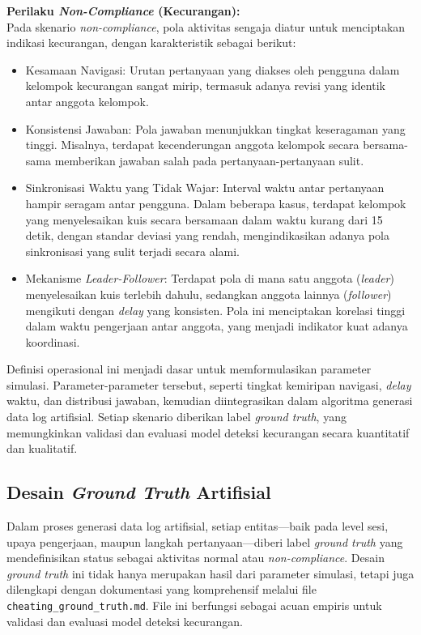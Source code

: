\textbf{Perilaku \textit{Non-Compliance} (Kecurangan):} \\
Pada skenario \textit{non-compliance}, pola aktivitas sengaja diatur untuk menciptakan indikasi kecurangan, dengan karakteristik sebagai berikut:
\begin{itemize}
    \item Kesamaan Navigasi: Urutan pertanyaan yang diakses oleh pengguna dalam kelompok kecurangan sangat mirip, termasuk adanya revisi yang identik antar anggota kelompok.
    \item Konsistensi Jawaban: Pola jawaban menunjukkan tingkat keseragaman yang tinggi. Misalnya, terdapat kecenderungan anggota kelompok secara bersama-sama memberikan jawaban salah pada pertanyaan-pertanyaan sulit.
    \item Sinkronisasi Waktu yang Tidak Wajar: Interval waktu antar pertanyaan hampir seragam antar pengguna. Dalam beberapa kasus, terdapat kelompok yang menyelesaikan kuis secara bersamaan dalam waktu kurang dari 15 detik, dengan standar deviasi yang rendah, mengindikasikan adanya pola sinkronisasi yang sulit terjadi secara alami.
    \item Mekanisme \textit{Leader-Follower}: Terdapat pola di mana satu anggota (\textit{leader}) menyelesaikan kuis terlebih dahulu, sedangkan anggota lainnya (\textit{follower}) mengikuti dengan \textit{delay} yang konsisten. Pola ini menciptakan korelasi tinggi dalam waktu pengerjaan antar anggota, yang menjadi indikator kuat adanya koordinasi.
\end{itemize}

Definisi operasional ini menjadi dasar untuk memformulasikan parameter simulasi. Parameter-parameter tersebut, seperti tingkat kemiripan navigasi, \textit{delay} waktu, dan distribusi jawaban, kemudian diintegrasikan dalam algoritma generasi data log artifisial. Setiap skenario diberikan label \textit{ground truth}, yang memungkinkan validasi dan evaluasi model deteksi kecurangan secara kuantitatif dan kualitatif.

\subsection{Desain \textit{Ground Truth} Artifisial}
\label{sec:desainGroundTruthArtifisial}
Dalam proses generasi data log artifisial, setiap entitas---baik pada level sesi, upaya pengerjaan, maupun langkah pertanyaan---diberi label \textit{ground truth} yang mendefinisikan status sebagai aktivitas normal atau \textit{non-compliance}. Desain \textit{ground truth} ini tidak hanya merupakan hasil dari parameter simulasi, tetapi juga dilengkapi dengan dokumentasi yang komprehensif melalui file \texttt{cheating\_ground\_truth.md}. File ini berfungsi sebagai acuan empiris untuk validasi dan evaluasi model deteksi kecurangan.


